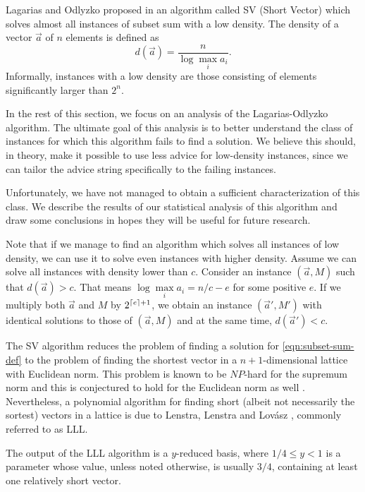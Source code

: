 Lagarias and Odlyzko proposed in \cite{lagarias-odlyzko} an algorithm
called SV (Short Vector) which solves almost all instances of subset sum
with a low density. The density of a vector $\vec{a}$ of $n$ elements is
defined as
$$
    d(\vec{a}) = \frac{n}{\log\max\limits_ia_i}.
$$
Informally, instances with a low density are those consisting of elements
significantly larger than $2^n$.

In the rest of this section, we focus on an analysis of the
Lagarias-Odlyzko algorithm. The ultimate goal of this analysis is to
better understand the class of instances for which this algorithm fails to
find a solution. We believe this should, in theory, make it possible to
use less advice for low-density instances, since we can tailor the advice
string specifically to the failing instances.

Unfortunately, we have not managed to obtain a sufficient characterization
of this class. We describe the results of our statistical analysis of this
algorithm and draw some conclusions in hopes they will be useful for
future research.

Note that if we manage to find an algorithm which solves all instances of
low density, we can use it to solve even instances with higher density.
Assume we can solve all instances with density lower than $c$. Consider an
instance $(\vec{a}, M)$ such that $d(\vec{a}) > c$. That means
$\log\max\limits_{i}a_i = n/c - e$ for some positive $e$. If we multiply
both $\vec{a}$ and $M$ by $2^{\lceil e\rceil+1}$, we obtain an instance
$(\vec{a}', M')$ with identical solutions to those of $(\vec{a}, M)$ and
at the same time, $d(\vec{a}') < c$.

The SV algorithm reduces the problem of finding a solution for
\eqref{eqn:subset-sum-def} to the problem of finding the shortest vector
in a $n+1$-dimensional lattice with Euclidean norm. This problem is known
to be $NP$-hard for the supremum norm and this is conjectured to hold for
the Euclidean norm as well \cite{van-emde-boas-shortest-vector}.
Nevertheless, a polynomial algorithm for finding short (albeit not
necessarily the sortest) vectors in a lattice is due to Lenstra, Lenstra
and Lovász \cite{LLL}, commonly referred to as LLL.

The output of the LLL algorithm is a $y$-reduced basis, where $1/4 \leq y
< 1$ is a parameter whose value, unless noted otherwise, is usually $3/4$,
containing at least one relatively short vector.

